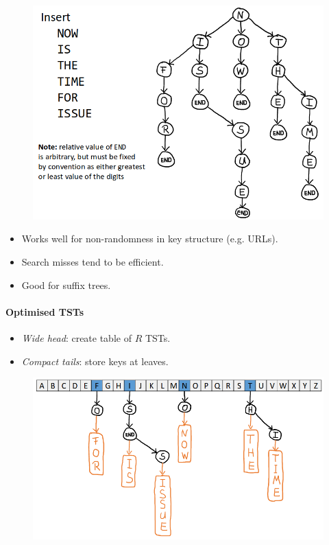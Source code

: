 \documentclass[twocolumn,english]{article}
\numberwithin{equation}{section}
\numberwithin{figure}{section}
\numberwithin{table}{section}
\begin{document}
\begin{figure}[H]
\centering{}\includegraphics[width=0.625\linewidth]{img/tst}
\end{figure}
\begin{itemize}
\item Works well for non-randomness in key structure (e.g. URLs).
\item Search misses tend to be efficient.
\item Good for suffix trees.
\end{itemize}

\paragraph{Optimised TSTs}
\begin{itemize}
\item \emph{Wide head}: create table of $R$ TSTs.
\item \emph{Compact tails}: store keys at leaves.
\end{itemize}
\begin{figure}[H]
\centering{}\includegraphics[width=0.7\linewidth]{img/opt-tst}
\end{figure}
\end{document}
